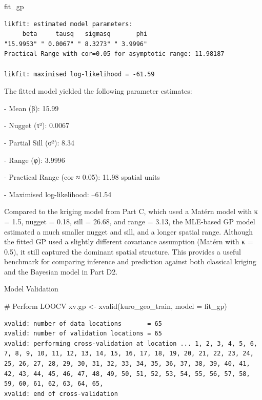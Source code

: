 \documentclass[
  11pt,
]{article}
\newenvironment{Shaded}{\begin{snugshade}}{\end{snugshade}}
\newcommand{\AttributeTok}[1]{\textcolor[rgb]{0.40,0.45,0.13}{#1}}
\newcommand{\CommentTok}[1]{\textcolor[rgb]{0.37,0.37,0.37}{#1}}
\newcommand{\FunctionTok}[1]{\textcolor[rgb]{0.28,0.35,0.67}{#1}}
\newcommand{\NormalTok}[1]{\textcolor[rgb]{0.00,0.23,0.31}{#1}}
\newcommand{\OtherTok}[1]{\textcolor[rgb]{0.00,0.23,0.31}{#1}}
\begin{document}
\begin{Shaded}
\begin{Highlighting}[]
\NormalTok{fit\_gp}
\end{Highlighting}
\end{Shaded}

\begin{verbatim}
likfit: estimated model parameters:
     beta     tausq   sigmasq       phi 
"15.9953" " 0.0067" " 8.3273" " 3.9996" 
Practical Range with cor=0.05 for asymptotic range: 11.98187

likfit: maximised log-likelihood = -61.59
\end{verbatim}

The fitted model yielded the following parameter estimates:

- Mean (β): 15.99

- Nugget (τ²): 0.0067

- Partial Sill (σ²): 8.34

- Range (φ): 3.9996

- Practical Range (cor ≈ 0.05): 11.98 spatial units

- Maximised log-likelihood: --61.54

Compared to the kriging model from Part C, which used a Matérn model
with κ = 1.5, nugget = 0.18, sill = 26.68, and range = 3.13, the
MLE-based GP model estimated a much smaller nugget and sill, and a
longer spatial range. Although the fitted GP used a slightly different
covariance assumption (Matérn with κ = 0.5), it still captured the
dominant spatial structure. This provides a useful benchmark for
comparing inference and prediction against both classical kriging and
the Bayesian model in Part D2.

Model Validation

\begin{Shaded}
\begin{Highlighting}[]
\CommentTok{\# Perform LOOCV}
\NormalTok{xv.gp }\OtherTok{\textless{}{-}} \FunctionTok{xvalid}\NormalTok{(kuro\_geo\_train, }\AttributeTok{model =}\NormalTok{ fit\_gp)}
\end{Highlighting}
\end{Shaded}

\begin{verbatim}
xvalid: number of data locations       = 65
xvalid: number of validation locations = 65
xvalid: performing cross-validation at location ... 1, 2, 3, 4, 5, 6, 7, 8, 9, 10, 11, 12, 13, 14, 15, 16, 17, 18, 19, 20, 21, 22, 23, 24, 25, 26, 27, 28, 29, 30, 31, 32, 33, 34, 35, 36, 37, 38, 39, 40, 41, 42, 43, 44, 45, 46, 47, 48, 49, 50, 51, 52, 53, 54, 55, 56, 57, 58, 59, 60, 61, 62, 63, 64, 65, 
xvalid: end of cross-validation
\end{verbatim}
\end{document}
